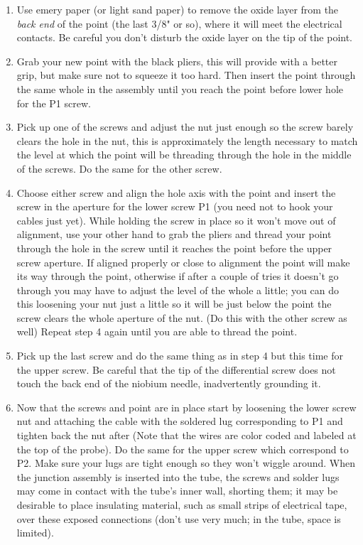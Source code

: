 \documentclass{../lab}
\begin{document}
\begin{enumerate}
    \item Use emery paper (or light sand paper) to remove the oxide layer from the \emph{back end }of the point (the last 3/8" or so), where it will meet the electrical contacts. Be careful you don't disturb the oxide layer on the tip of the point.

    \item Grab your new point with the black pliers, this will provide with a better grip, but make sure not to squeeze it too hard. Then insert the point through the same whole in the assembly until you reach the point before lower hole for the P1 screw.

    \item Pick up one of the screws and adjust the nut just enough so the screw barely clears the hole in the nut, this is approximately the length necessary to match the level at which the point will be threading through the hole in the middle of the screws. Do the same for the other screw.

    \item Choose either screw and align the hole axis with the point and insert the screw in the aperture for the lower screw P1 (you need not to hook your cables just yet). While holding the screw in place so it won't move out of alignment, use your other hand to grab the pliers and thread your point through the hole in the screw until it reaches the point before the upper screw aperture. If aligned properly or close to alignment the point will make its way through the point, otherwise if after a couple of tries it doesn't go through you may have to adjust the level of the whole a little; you can do this loosening your nut just a little so it will be just below the point the screw clears the whole aperture of the nut. (Do this with the other screw as well)  Repeat step 4 again until you are able to thread the point.

    \item Pick up the last screw and do the same thing as in step 4 but this time for the upper screw. Be careful that the tip of the differential screw does not touch the back end of the niobium needle, inadvertently grounding it.

    \item Now that the screws and point are in place start by loosening the lower screw nut and attaching the cable with the soldered lug corresponding to P1 and tighten back the nut after (Note that the wires are color coded and labeled at the top of the probe). Do the same for the upper screw which correspond to P2. Make sure your lugs are tight enough so they won't wiggle around. When the junction assembly is inserted into the tube, the screws and solder lugs may come in contact with the tube's inner wall, shorting them; it may be desirable to place insulating material, such as small strips of electrical tape, over these exposed connections (don't use very much; in the tube, space is limited).

\end{enumerate}
\end{document}
